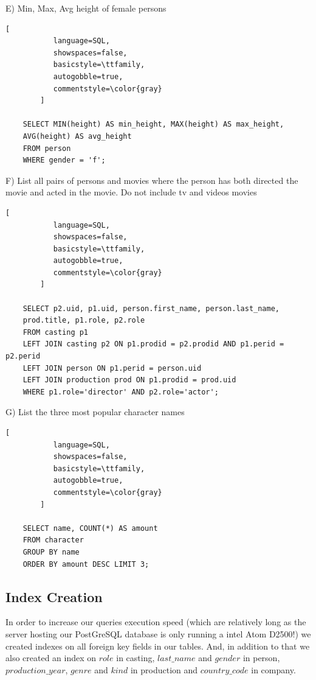 \documentclass{article}
\begin{document}
E) Min, Max, Avg height of female persons
    \begin{lstlisting}[
           language=SQL,
           showspaces=false,
           basicstyle=\ttfamily,
           autogobble=true,
           commentstyle=\color{gray}
        ]
        
    SELECT MIN(height) AS min_height, MAX(height) AS max_height, 
    AVG(height) AS avg_height 
    FROM person
    WHERE gender = 'f';
    \end{lstlisting}
\medskip

F) List all pairs of persons and movies where the person has both directed the movie and acted in the movie. Do not include tv and videos movies
    \begin{lstlisting}[
           language=SQL,
           showspaces=false,
           basicstyle=\ttfamily,
           autogobble=true,
           commentstyle=\color{gray}
        ]
        
    SELECT p2.uid, p1.uid, person.first_name, person.last_name, 
    prod.title, p1.role, p2.role 
    FROM casting p1
    LEFT JOIN casting p2 ON p1.prodid = p2.prodid AND p1.perid = p2.perid
    LEFT JOIN person ON p1.perid = person.uid
    LEFT JOIN production prod ON p1.prodid = prod.uid
    WHERE p1.role='director' AND p2.role='actor';
    \end{lstlisting}
\medskip

G) List the three most popular character names
    \begin{lstlisting}[
           language=SQL,
           showspaces=false,
           basicstyle=\ttfamily,
           autogobble=true,
           commentstyle=\color{gray}
        ]
        
    SELECT name, COUNT(*) AS amount
    FROM character
    GROUP BY name
    ORDER BY amount DESC LIMIT 3;
    \end{lstlisting}
\medskip

\subsection{Index Creation}
In order to increase our queries execution speed (which are relatively long as the server hosting our PostGreSQL database is only running a intel Atom D2500!) we created indexes on all foreign key fields in our tables.
And, in addition to that we also created an index on $role$ in casting, $last\_name$ and $gender$ in person, $production\_year$, $genre$ and $kind$ in production and $country\_code$ in company.
\end{document}
